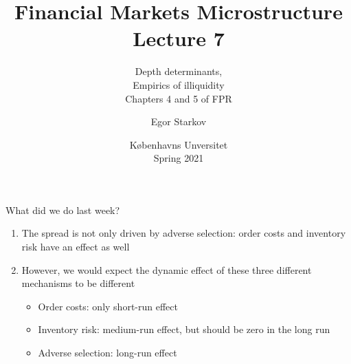 \documentclass[english,10pt
,aspectratio=169
]{beamer}
\title{Financial Markets Microstructure \\ Lecture 7}
\subtitle{Depth determinants, \\ Empirics of illiquidity\\
	Chapters 4 and 5 of FPR}
\author{Egor Starkov}
\date{K{\o}benhavns Unversitet \\
	Spring 2021}
\begin{document}
	

\frame[plain]{\titlepage}


\begin{frame}{What did we do last week?}
	\begin{enumerate}
		\item The spread is not only driven by adverse selection: order costs and inventory risk have an effect as well
		\item However, we would expect the dynamic effect of these three different mechanisms to be different
		\begin{itemize}
			\item Order costs: only short-run effect 
			\item Inventory risk: medium-run effect, but should be zero in the long run
			\item Adverse selection: long-run effect 
		\end{itemize}
	\end{enumerate}
\end{frame}


\end{document}
